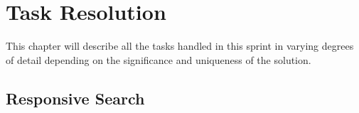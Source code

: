 \chapter{Task Resolution}
This chapter will describe all the tasks handled in this sprint in varying degrees of detail depending on the significance and uniqueness of the solution.



\section{Responsive Search}\label{RSearch}






